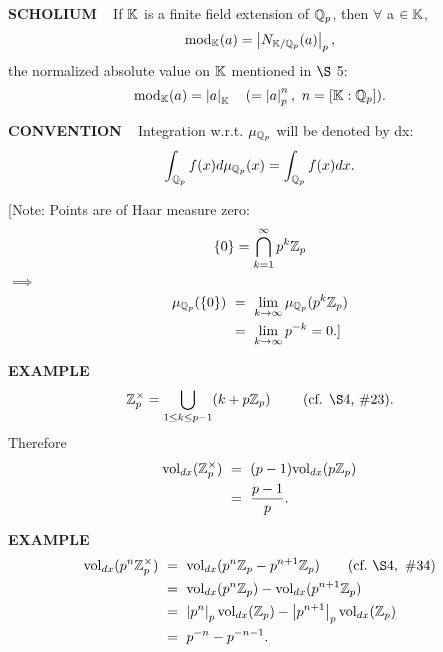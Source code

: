 \vspace{0.1cm}

\begin{x}{\small\bf SCHOLIUM}  \ %
If $\mathbb{K}$ is a finite field extension of $\mathbb{Q}_p$, then $\forall$ a $\in \mathbb{K}$, 
\[
\text{mod}_{\mathbb{K}}(a) = \left\vert N_{\mathbb{K}/ \mathbb{Q}_p}(a)\right\vert_{p},
\]
the normalized absolute value on $\mathbb{K}$ mentioned in $\S$ 5:
\[
\modxs_\K(a) = \abs{a}_\K \quad (= \abs{a}_p^n, \ n = [\K:\Q_p]).
\]
\end{x}

\vspace{0.1cm}

\begin{x}{\small\bf CONVENTION}  \ %
Integration w.r.t. $\mu_{\mathbb{Q}_p}$ will be denoted by dx:
\[
\int_{\mathbb{Q}_p}f(x)d\mu_{\mathbb{Q}_p}(x) = \int_{\mathbb{Q}_p}f(x)dx.
\]

[Note: Points are of Haar measure zero:
\[
\{0\} = \bigcap\limits_{k=1}^{\infty} p^k\mathbb{Z}_p
\]
\qquad\qquad\qquad\qquad$\implies$
\[
\begin{aligned}
\mu_{\Q_p} (\{0\}) \ 
&= \  \lim_{k \ra \infty} \mu_{\Q_p}(p^k\Z_p)\\
&= \  \lim_{k\ra \infty} p^{-k} = 0.]
\end{aligned}
\]
\end{x}

\vspace{0.1cm}

\begin{x}{\small\bf EXAMPLE} \ %
\[
\Z_p^\times = \bigcup\limits_{1 \le k \le p-1} (k+ p\Z_p)	\qquad \text{ $($cf. $\S 4$, $\#23$)}.
\]
Therefore
\[
\begin{aligned}
\text{vol}_{dx}(\mathbb{Z}_p^\times)  \
&= \ (p-1)\text{vol}_{dx}(p\mathbb{Z}_p ) \\
&= \ \frac{p-1}{p}.
\end{aligned}
\]
\end{x}

\vspace{0.1cm}

\begin{x}{\small\bf EXAMPLE}  \ %
\[
\begin{aligned}
\vol_{dx}(p^n\Z_p^\times)  \
&= \ \vol_{dx}(p^n\Z_p - p^{n+1}\Z_p)		\qquad \text{(cf.} \  \S 4, \ \# 34)\\
&= \ \vol_{dx}(p^n\Z_p) - \vol_{dx}(p^{n+1}\Z_p)	\\	
&= \ \abs{p^n}_p \vol_{dx}(\Z_p) - \abs{p^{n+1}}_p \vol_{dx}(\Z_p)\\
&= \ p^{-n} - p^{-n-1}.
\end{aligned}
\]
\end{x}

